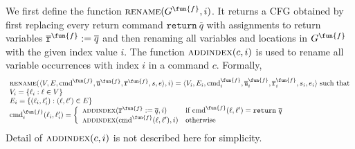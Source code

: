 We first define the function $\textsc{rename}(G^\fun{f},i)$. It returns a CFG obtained by first replacing every return command $\mathtt{return}\ \overline{q}$ with assignments to return variables $\overline{\texttt{r}}^\fun{f} := \overline{q}$ and then renaming all variables and locations in $G^\fun{f}$ with the given index value $i$. The function $\textsc{addindex}(c, i)$ is used to rename all variable occurrences with index $i$ in a command $c$. Formally,
\[
\begin{array}{l}
\textsc{rename}(\langle V, E,\textmd{cmd}^\fun{f}, \overline{\texttt{u}}^\fun{f}, \overline{\texttt{r}}^\fun{f},s,e \rangle,i) = \langle V_i, E_i,\textmd{cmd}_i^\fun{f},
\overline{\texttt{u}}_i^\fun{f}, \overline{\texttt{r}}_i^\fun{f},s_i,e_i \rangle \text{ such that}\\
V_i = \{\ell_i:\ell \in V\} \\
E_i = \{(\ell_i,\ell'_i): (\ell,\ell') \in E\} \\
\textmd{cmd}_i^\fun{f}(\ell_i,\ell'_i) = 
  \left\{
  \begin{array}{ll}
   \textsc{addindex}(\overline{\texttt{r}}^\fun{f}:=\overline{q}, i) &\text{if } \textmd{cmd}^\fun{f}(\ell,\ell') = \mathtt{return}\  \overline{q} \\
   \textsc{addindex}(\textmd{cmd}^\fun{f}(\ell,\ell'), i) &\text{otherwise}
  \end{array}
  \right.
\end{array}
\]
Detail of $\textsc{addindex}(c, i)$ is not described here for simplicity.

